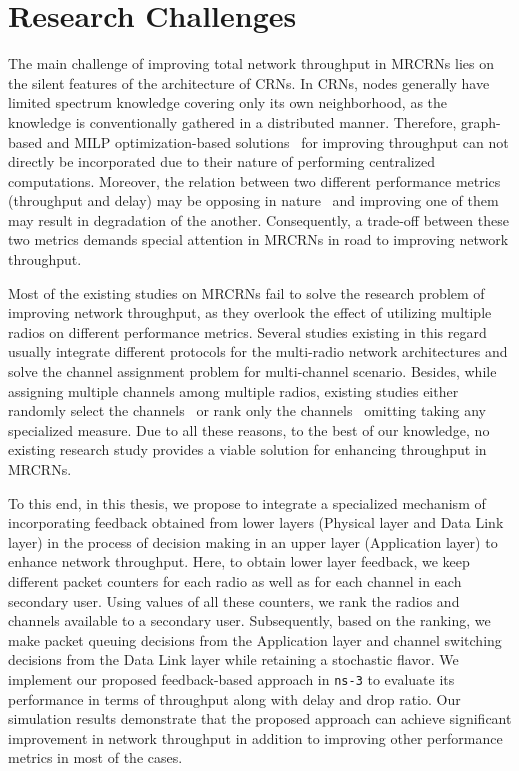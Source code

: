 \section{Research Challenges}
The main challenge of improving total network throughput in MRCRNs lies on the silent features of the architecture of CRNs. In CRNs, nodes generally have limited spectrum knowledge covering only its own neighborhood, as the knowledge is conventionally gathered in a distributed manner. Therefore, graph-based and MILP optimization-based solutions~\cite{hoang2008downlink,ahmed2014channel} for improving throughput can not directly be incorporated due to their nature of performing centralized computations. Moreover, the relation between two different performance metrics (throughput and delay) may be opposing in nature~\cite{gamal2004throughput} and improving one of them may result in degradation of the another. Consequently, a trade-off between these two metrics demands special attention in MRCRNs in road to improving network throughput.

Most of the existing studies on MRCRNs fail to solve the research problem of improving network throughput, as they overlook the effect of utilizing multiple radios on different performance metrics. Several studies existing in this regard~\cite{de2012survey, feng2009joint, zhong2014capacity, li2014deterministic} usually integrate different protocols for the multi-radio network architectures and solve the channel assignment problem for multi-channel scenario. Besides, while assigning multiple channels among multiple radios, existing studies either randomly select the channels~\cite{khan2015towards} or rank only the channels~\cite{zhong2014capacity} omitting taking any specialized measure. Due to all these reasons, to the best of our knowledge, no existing research study provides a viable solution for enhancing throughput in MRCRNs.

To this end, in this thesis, we propose to integrate a specialized mechanism of incorporating feedback obtained from lower layers (Physical layer and Data Link layer) in the process of decision making in an upper layer (Application layer) to enhance network throughput. Here, to obtain lower layer feedback, we keep different packet counters for each radio as well as for each channel in each secondary user. Using values of all these counters, we rank the radios and channels available to a secondary user. Subsequently, based on the ranking, we make packet queuing decisions from the Application layer and channel switching decisions from the Data Link layer while retaining a stochastic flavor. We implement our proposed feedback-based approach in \texttt{ns-3} to evaluate its performance in terms of throughput along with delay and drop ratio. Our simulation results demonstrate that the proposed approach can achieve significant improvement in network throughput in addition to improving other performance metrics in most of the cases.

